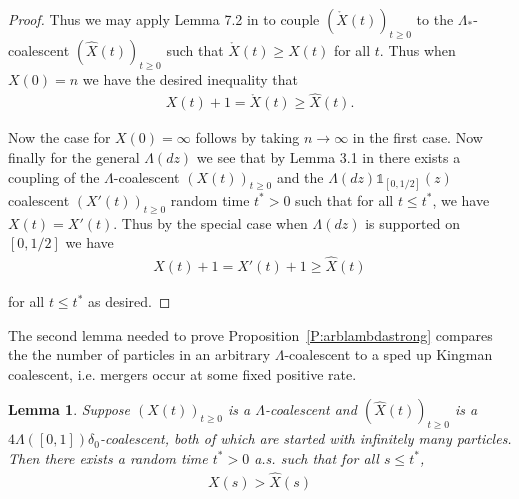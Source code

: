 \documentclass[11pt]{article}
\newtheorem{lemma}{Lemma}
\theoremstyle{definition}
\newcommand{\propref}[1]{Proposition~\ref{P:#1}}
\begin{document}
\begin{proof}
    \noindent Thus we may apply Lemma 7.2 in \cite{Angel2012} to couple $(\mathring{X}(t))_{t\geq 0}$ to the $\Lambda_*$-coalescent $(\widehat{X}(t))_{t\geq 0}$ such that $\mathring{X}(t) \geq X(t)$ for all $t$. Thus when $X(0) = n$ we have the desired inequality that
    \begin{align*}
        X(t) +1 = \mathring{X}(t) \geq \widehat{X}(t).
    \end{align*}

    \noindent Now the case for $X(0) = \infty$ follows by taking $n \to \infty$ in the first case. Now finally for the general $\Lambda(dz)$ we see that by Lemma 3.1 in \cite{betasmalltime} there exists a coupling of the $\Lambda$-coalescent $(X(t))_{t\geq 0}$ and the $\Lambda(dz)\mathds{1}_{[0,1/2]}(z)$ coalescent $(X'(t))_{t\geq 0}$  random time $t^* > 0$ such that for all $t \leq t^*$, we have $X(t) = X'(t)$. Thus by the special case when $\Lambda(dz)$ is supported on $[0,1/2]$ we have 
    \begin{align*}
        X(t) + 1 = X'(t) +1 \geq \widehat{X}(t)
    \end{align*}

    \noindent for all $t \leq t^*$ as desired.
\end{proof}


\noindent The second lemma needed to prove \propref{arblambdastrong} compares the the number of particles in an arbitrary $\Lambda$-coalescent to a sped up Kingman coalescent, i.e. mergers occur at some fixed positive rate. 

\begin{lemma}\label{L:kingmancontrol}
    Suppose $(X(t))_{t \geq 0}$ is a $\Lambda$-coalescent and $(\widehat{X}(t))_{t \geq 0}$ is a $4\Lambda([0,1])\delta_0$-coalescent, both of which are started with infinitely many particles. Then there exists a random time $t^* > 0$ a.s. such that for all $s \leq t^*$,
    \begin{align*}
        X(s) > \widehat{X}(s)
    \end{align*}
\end{lemma}
\end{document}
